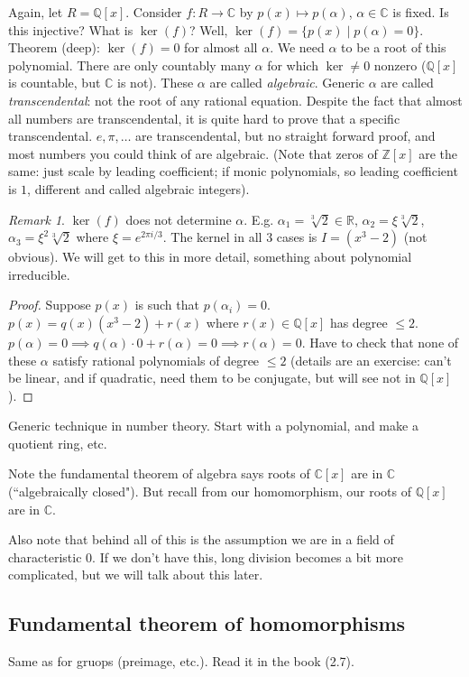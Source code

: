 \documentclass{article}
\theoremstyle{plain}
\theoremstyle{remark}
\newtheorem{remark}{Remark}
\newcommand{\Z}{{\mathbb Z}}
\newcommand{\Q}{{\mathbb Q}}
\newcommand{\R}{{\mathbb R}}
\newcommand{\C}{{\mathbb C}}
\begin{document}
Again, let $R = \Q[x]$.
Consider $f \colon R \to \C$ by $p(x) \mapsto p(\alpha)$, $\alpha \in \C$ is fixed.
Is this injective? What is $\ker(f)$?
Well, $\ker(f) = \{p(x) \mid p(\alpha) = 0\}$.
Theorem (deep): $\ker(f) = 0$ for almost all $\alpha$.
We need $\alpha$ to be a root of this polynomial.
There are only countably many $\alpha$ for which $\ker \neq 0$ nonzero
($\Q[x]$ is countable, but $\C$ is not).
These $\alpha$ are called \emph{algebraic}.
Generic $\alpha$ are called \emph{transcendental}:
not the root of any rational equation.
Despite the fact that almost all numbers are transcendental,
it is quite hard to prove that a specific transcendental.
$e, \pi, \dots$ are transcendental, but no straight forward proof,
and most numbers you could think of are algebraic.
(Note that zeros of $\Z[x]$ are the same: just scale by leading coefficient;
if monic polynomials, so leading coefficient is $1$, different and called algebraic integers).
\begin{remark}
	$\ker(f)$ does not determine $\alpha$.
	E.g. $\alpha_1 = \sqrt[3]{2} \in \R$,
	$\alpha_2 = \xi\sqrt[3]{2}$, $\alpha_3 = \xi^2\sqrt[3]{2}$
	where $\xi = e^{2\pi i/3}$.
	The kernel in all $3$ cases is $I = (x^3 - 2)$ (not obvious).
	We will get to this in more detail, something about polynomial irreducible.
\end{remark}
\begin{proof}
	Suppose $p(x)$ is such that $p(\alpha_i) = 0$.
	$p(x) = q(x)(x^3 - 2) + r(x)$ where $r(x) \in \Q[x]$ has degree $\leq 2$.
	$p(\alpha) = 0 \implies q(\alpha)\cdot 0 + r(\alpha) = 0
	\implies r(\alpha) = 0$.
	Have to check that none of these $\alpha$ satisfy rational
	polynomials of degree $\leq 2$
	(details are an exercise: can't be linear,
	and if quadratic, need them to be conjugate, but will see not in $\Q[x]$).
\end{proof}
Generic technique in number theory.
Start with a polynomial, and make a quotient ring, etc.

Note the fundamental theorem of algebra says roots of $\C[x]$
are in $\C$ (``algebraically closed").
But recall from our homomorphism, our roots of $\Q[x]$ are in $\C$.

Also note that behind all of this is the assumption
we are in a field of characteristic $0$.
If we don't have this, long division becomes a bit more complicated,
but we will talk about this later.

\subsection{Fundamental theorem of homomorphisms}
Same as for gruops (preimage, etc.).
Read it in the book (2.7).
\end{document}
